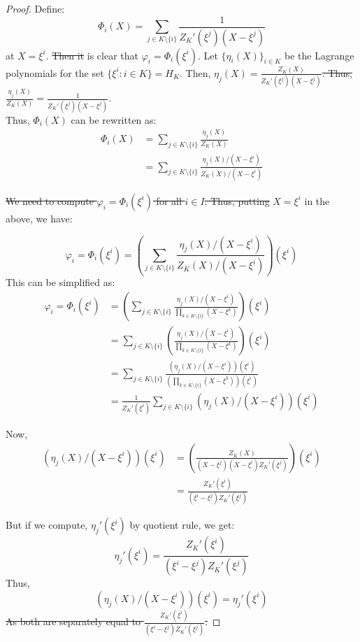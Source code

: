 \documentclass[sigconf]{acmart}
\providecommand{\DIFaddtex}[1]{{\protect\color{blue}\uwave{#1}}} %
\providecommand{\DIFdeltex}[1]{{\protect\color{red}\sout{#1}}}                      %
\providecommand{\DIFaddbegin}{} %
\providecommand{\DIFaddend}{} %
\providecommand{\DIFdelbegin}{} %
\providecommand{\DIFdelend}{} %
\providecommand{\DIFadd}[1]{\texorpdfstring{\DIFaddtex{#1}}{#1}} %
\providecommand{\DIFdel}[1]{\texorpdfstring{\DIFdeltex{#1}}{}} %
\newcommand{\DIFscaledelfig}{0.5}
\newlength{\DIFdelgraphicswidth} %
\newlength{\DIFdelgraphicsheight} %
\newcommand{\DIFaddincludegraphics}[2][]{{\color{blue}\fbox{\DIFOincludegraphics[#1]{#2}}}} %
\newcommand{\DIFdelincludegraphics}[2][]{%
	\sbox{\DIFdelgraphicsbox}{\DIFOincludegraphics[#1]{#2}}%
	\settoboxwidth{\DIFdelgraphicswidth}{\DIFdelgraphicsbox} %
	\settoboxtotalheight{\DIFdelgraphicsheight}{\DIFdelgraphicsbox} %
	\scalebox{\DIFscaledelfig}{%
		\parbox[b]{\DIFdelgraphicswidth}{\usebox{\DIFdelgraphicsbox}\\[-\baselineskip] \rule{\DIFdelgraphicswidth}{0em}}\llap{\resizebox{\DIFdelgraphicswidth}{\DIFdelgraphicsheight}{%
				\setlength{\unitlength}{\DIFdelgraphicswidth}%
				\begin{picture}(1,1)%
					\thicklines\linethickness{2pt} %
					{\color[rgb]{1,0,0}\put(0,0){\framebox(1,1){}}}%
					{\color[rgb]{1,0,0}\put(0,0){\line( 1,1){1}}}%
					{\color[rgb]{1,0,0}\put(0,1){\line(1,-1){1}}}%
				\end{picture}%
			}\hspace*{3pt}}} %
} %
\DeclareRobustCommand{\DIFaddbegin}{\DIFOaddbegin \let\includegraphics\DIFaddincludegraphics} %
\DeclareRobustCommand{\DIFaddend}{\DIFOaddend \let\includegraphics\DIFOincludegraphics} %
\DeclareRobustCommand{\DIFdelbegin}{\DIFOdelbegin \let\includegraphics\DIFdelincludegraphics} %
\DeclareRobustCommand{\DIFdelend}{\DIFOaddend \let\includegraphics\DIFOincludegraphics} %
\begin{document}
\begin{proof}
		Define:
		$$ \Phi_i(X) = \sum_{j\in K\setminus \{i\}} \frac{1}{Z_K'(\xi^j)(X-\xi^j)} $$
		at $X=\xi^i$. \DIFdelbegin \DIFdel{Then it }\DIFdelend \DIFaddbegin \DIFadd{It }\DIFaddend is clear that $\varphi_i=\Phi_i(\xi^i)$.
		Let $\{\eta_i(X)\}_{i\in K}$ be the Lagrange polynomials for the set $\{\xi^i:i\in K\}= H_K$.
		Then, \DIFdelbegin \DIFdel{$\eta_j(X)=\frac{Z_K(X)}{Z_K'(\xi^j)(X-\xi^j)}$.
			Thus, }\DIFdelend $\frac{\eta_j(X)}{Z_K(X)}=\frac{1}{Z_K'(\xi^j)(X-\xi^j)}$.\\
		Thus, $\Phi_i(X)$ can be rewritten as:
		\begin{align*}
			\Phi_i(X)&=\sum_{j\in K\setminus \{i\}} \frac{\eta_j(X)}{Z_K(X)}\\
			&= \sum_{j\in K\setminus \{i\}} \frac{\eta_j(X)/(X-\xi^i)}{Z_K(X)/(X-\xi^i)}
		\end{align*}
		
		\DIFdelbegin \DIFdel{We need to compute $\varphi_i=\Phi_i(\xi^i)$ for all $i \in I$. Thus, putting }\DIFdelend \DIFaddbegin \DIFadd{Putting }\DIFaddend $X=\xi^i$ in the above, we have:
		
		$$\varphi_i = \Phi_i(\xi^i) = \left(\sum_{j\in K\setminus \{i\}}\frac{\eta_j(X)/(X-\xi^i)}{Z_K(X)/(X-\xi^i)}\right)(\xi^i)$$
		This can be simplified as:
		\begin{align*}\varphi_i = \Phi_i(\xi^i) &= \left(\sum_{j\in K\setminus \{i\}}\frac{\eta_j(X)/(X-\xi^i)}{\prod_{k \in K \setminus \{i\}}(X-\xi^k)}\right)(\xi^i)\\
			&= \sum_{j\in K\setminus \{i\}}\left(\frac{\eta_j(X)/(X-\xi^i)}{\prod_{k \in K \setminus \{i\}}(X-\xi^k)}\right)(\xi^i)\\
			&= \sum_{j\in K\setminus \{i\}}\frac{\left(\eta_j(X)/(X-\xi^i)\right)(\xi^i)}{\left(\prod_{k \in K \setminus \{i\}}(X-\xi^k)\right)(\xi^i)}\\
			&= \frac{1}{Z_K'(\xi^i)}\sum_{j\in K\setminus \{i\}}\left(\eta_j(X)/(X-\xi^i)\right)(\xi^i)
		\end{align*}
		
		Now, \begin{align*}
			\left(\eta_j(X)/(X-\xi^i)\right)(\xi^i)&=\left(\frac{Z_K(X)}{(X-\xi^j)(X-\xi^i)Z_K'(\xi^j)}\right)(\xi^i)\\
			&= \frac{Z_K'(\xi^i)}{(\xi^i-\xi^j)Z_K'(\xi^j)}
		\end{align*}
		
		But if we compute, $\eta_j'(\xi^i)$ by quotient rule, we get:
		$$\eta_j'(\xi^i)=\frac{Z_K'(\xi^i)}{(\xi^i-\xi^j)Z_K'(\xi^j)}$$
		Thus,
		$$\left(\eta_j(X)/(X-\xi^i)\right)(\xi^i)=\eta_j'(\xi^i) $$
		\DIFdelbegin \DIFdel{As both are separately equal to $\frac{Z_K'(\xi^i)}{(\xi^i-\xi^j)Z_K'(\xi^j)}$.}%
		\DIFdelend \DIFaddbegin 
		

\end{proof}
\end{document}
